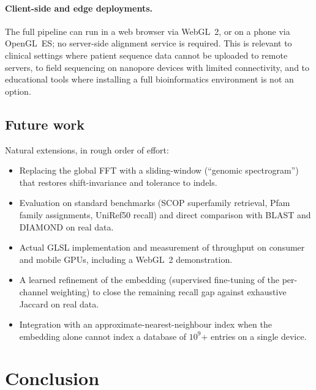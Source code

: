 \documentclass[twocolumn,11pt,a4paper]{article}
\theoremstyle{definition}
\theoremstyle{remark}
\begin{document}
\paragraph{Client-side and edge deployments.} The full pipeline can run in
a web browser via WebGL~2, or on a phone via OpenGL~ES; no server-side
alignment service is required. This is relevant to clinical settings
where patient sequence data cannot be uploaded to remote servers, to field
sequencing on nanopore devices with limited connectivity, and to
educational tools where installing a full bioinformatics environment is
not an option.

\subsection{Future work}

Natural extensions, in rough order of effort:
\begin{itemize}
    \item Replacing the global FFT with a sliding-window (``genomic
    spectrogram'') that restores shift-invariance and tolerance to indels.
    \item Evaluation on standard benchmarks (SCOP superfamily retrieval,
    Pfam family assignments, UniRef50 recall) and direct comparison with
    BLAST and DIAMOND on real data.
    \item Actual GLSL implementation and measurement of throughput on
    consumer and mobile GPUs, including a WebGL~2 demonstration.
    \item A learned refinement of the embedding (supervised fine-tuning of
    the per-channel weighting) to close the remaining recall gap against
    exhaustive Jaccard on real data.
    \item Integration with an approximate-nearest-neighbour index
    \citep{malkov2020,johnson2021} when the embedding alone cannot index
    a database of $10^9$+ entries on a single device.
\end{itemize}

\section{Conclusion}
\label{sec:conclusion}
\end{document}
